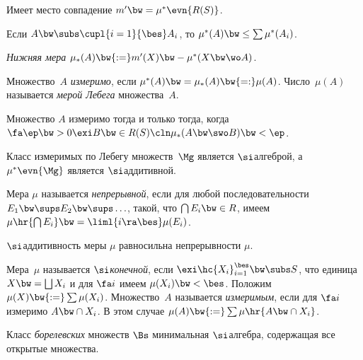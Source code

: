 \documentclass[a4paper,draft]{article}
\begin{document}
\begin{stm}
  Имеет место совпадение $m' \bw= \mu^*\evn{R(S)}$.
\end{stm}

\begin{theorem}
  Если $A \bw\subs \cupl{i=1}{\bes}A_i$, то $\mu^*(A) \bw\le \sum\mu^*(A_i)$.
\end{theorem}

\begin{df}
  \emph{Нижняя мера} $\mu_*(A) \bw{:=} m'(X) \bw- \mu^*(X \bw\wo A)$.
\end{df}

\begin{df}
  Множество~$A$ \emph{измеримо}, если $\mu^*(A) \bw= \mu_*(A) \bw{=:} \mu(A)$.
  Число~$\mu(A)$ называется \emph{мерой Лебега} множества~$A$.
\end{df}

\begin{theorem}
  Множество $A$ измеримо тогда и только тогда, когда
  $\fa\ep \bw> 0 \exi B \bw\in R(S)\cln \mu_*(A\bw\swo B) \bw< \ep$.
\end{theorem}

\begin{theorem}
  Класс измеримых по Лебегу множеств~$\Mg$ является $\si$\д алгеброй,
  а $\mu^*\evn{\Mg}$ является $\si$\д аддитивной.
\end{theorem}

\begin{df}
  Мера $\mu$ называется \emph{непрерывной}, если для любой последовательности
  $E_1 \bw\sups E_2 \bw\sups \ldots$, такой, что $\bigcap E_i \bw\in R$, имеем
  $\mu\hr{\bigcap E_i} \bw= \liml{i\ra\bes} \mu(E_i)$.
\end{df}

\begin{theorem}
  $\si$\д аддитивность меры $\mu$ равносильна непрерывности $\mu$.
\end{theorem}

\begin{df}
  Мера~$\mu$ называется \emph{$\si$\д конечной}, если $\exi\hc{X_i}_{i=1}^\bes \bw\subs S$, что
  единица $X \bw= \bigsqcup X_i$ и
  для $\fa i$ имеем $\mu(X_i) \bw< \bes$. Положим $\mu(X) \bw{:=} \sum \mu(X_i)$.
  Множество~$A$ называется \emph{измеримым}, если для $\fa i$ измеримо $A \bw\cap X_i$.
  В этом случае $\mu(A) \bw{:=} \sum\mu\hr{A\bw\cap X_i}$.
\end{df}

\begin{df}
  Класс \emph{борелевских} множеств $\Bs$\т
  минимальная $\si$\д алгебра, содержащая все открытые множества.
\end{df}
\end{document}
